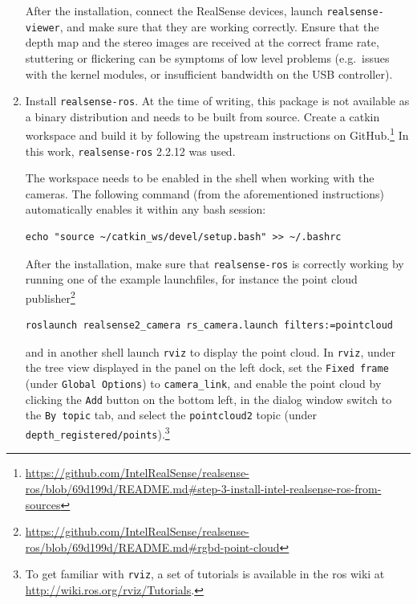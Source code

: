 \documentclass[11pt, letterpaper, twoside]{article}
\begin{document}
\begin{enumerate}
        After the installation, connect the RealSense devices, launch
        \texttt{realsense-viewer}, and make sure that they are working
        correctly. Ensure that the depth map and the stereo images are received
        at the correct frame rate, stuttering or flickering can be symptoms of
        low level problems (e.g.\ issues with the kernel modules, or
        insufficient bandwidth on the USB controller).

    \item Install \texttt{realsense-ros}. At the time of writing, this package
        is not available as a binary distribution and needs to be built from
        source. Create a catkin workspace and build it by following the
        upstream instructions on
        GitHub.\footnote{\url{https://github.com/IntelRealSense/realsense-ros/blob/69d199d/README.md\#step-3-install-intel-realsense-ros-from-sources}}
        In this work, \texttt{realsense-ros} 2.2.12 was used.

        The workspace needs to be enabled in the shell when working with the
        cameras. The following command (from the aforementioned instructions)
        automatically enables it within any bash session:
\begin{Verbatim}[samepage=true]
    echo "source ~/catkin_ws/devel/setup.bash" >> ~/.bashrc
\end{Verbatim}
        After the installation, make sure that \texttt{realsense-ros} is
        correctly working by running one of the example launchfiles, for
        instance the point cloud publisher\footnote{\url{https://github.com/IntelRealSense/realsense-ros/blob/69d199d/README.md\#rgbd-point-cloud}}
\begin{Verbatim}[samepage=true]
    roslaunch realsense2_camera rs_camera.launch filters:=pointcloud
\end{Verbatim}
        and in another shell launch \texttt{rviz} to display the point cloud.
        In \texttt{rviz}, under the tree view displayed in the panel on the
        left dock, set the \texttt{Fixed frame} (under \texttt{Global Options})
        to \texttt{camera\_link}, and enable the point cloud by clicking the
        \texttt{Add} button on the bottom left, in the dialog window switch to
        the \texttt{By topic} tab, and select the \texttt{pointcloud2} topic
        (under \texttt{depth\_registered/points}).\footnote{To get familiar
        with \texttt{rviz}, a set of tutorials is available in the \gls{ros}
        wiki at \url{http://wiki.ros.org/rviz/Tutorials}.}


\end{enumerate}
\end{document}
